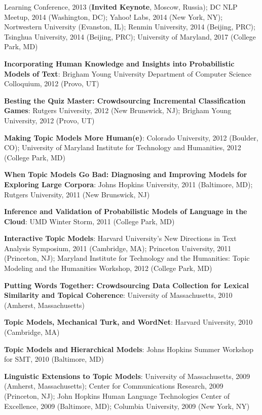 {{\begin{enumerate*}
          Learning Conference, 2013 ({\bf Invited Keynote}, Moscow,
          Russia); DC NLP Meetup, 2014 (Washington, DC); Yahoo! Labs, 2014 (New
          York, NY); Nortwestern University (Evanston, IL); Renmin
          University, 2014 (Beijing, PRC); Tsinghua University, 2014
          (Beijing, PRC); University of Maryland, 2017 (College Park, MD)
	\item {\bf Incorporating Human Knowledge and Insights into Probabilistic Models of Text}: Brigham Young University Department of Computer Science Colloquium, 2012 (Provo, UT)
	\item {\bf Besting the Quiz Master: Crowdsourcing Incremental Classification Games}: Rutgers University, 2012 (New Brunswick, NJ); Brigham Young University, 2012 (Provo, UT)
	\item {\bf Making Topic Models More Human(e)}: Colorado University, 2012 (Boulder, CO); University of Maryland Institute for Technology and Humanities, 2012 (College Park, MD)
	\item {\bf When Topic Models Go Bad: Diagnosing and Improving Models for Exploring Large Corpora}: Johns Hopkins University, 2011 (Baltimore, MD); Rutgers University, 2011 (New Brunswick, NJ)
	\item {\bf Inference and Validation of Probabilistic Models of Language in the Cloud}: UMD Winter Storm, 2011 (College Park, MD)
	\item {\bf Interactive Topic Models}: Harvard University's New Directions in Text Analysis Symposium, 2011 (Cambridge, MA); Princeton University, 2011 (Princeton, NJ); Maryland Institute for Technology and the Humanities: Topic Modeling and the Humanities Workshop, 2012 (College Park, MD)
	\item {\bf Putting Words Together: Crowdsourcing Data Collection for Lexical Similarity and Topical Coherence}: University of Massachusetts, 2010 (Amherst, Massachusetts)
	\item {\bf Topic Models, Mechanical Turk, and WordNet}: Harvard University, 2010 (Cambridge, MA)
	\item {\bf Topic Models and Hierarchical Models}: Johns Hopkins Summer Workshop for SMT, 2010 (Baltimore, MD)
	\item {\bf Linguistic Extensions to Topic Models}: University of
          Massachusetts, 2009 (Amherst, Massachusetts); Center for
          Communications Research, 2009 (Princeton, NJ); John Hopkins Human
          Language Technologies Center of Excellence, 2009 (Baltimore, MD); Columbia University, 2009 (New York, NY)
\end{enumerate*}


}
}



